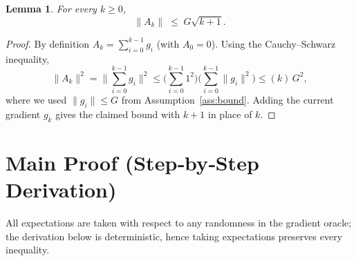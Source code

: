 \documentclass{article}
\newtheorem{lemma}{Lemma}
\begin{document}
\begin{lemma}\label{lem:cum}
For every $k\ge0$,
\[
\|A_k\|\;\le\; G\sqrt{k+1}.
\]
\end{lemma}
\begin{proof}
By definition $A_k=\sum_{i=0}^{k-1}g_i$ (with $A_0=0$). Using the Cauchy–Schwarz
inequality,
\[
\|A_k\|^2 = \Big\|\sum_{i=0}^{k-1}g_i\Big\|^2
          \le \Big(\sum_{i=0}^{k-1}1^2\Big)\Big(\sum_{i=0}^{k-1}\|g_i\|^2\Big)
          \le (k)\,G^{2},
\]
where we used $\|g_i\|\le G$ from Assumption~\ref{ass:bound}. Adding the
current gradient $g_k$ gives the claimed bound with $k+1$ in place of $k$.
\end{proof}

\section*{Main Proof (Step‑by‑Step Derivation)}
All expectations are taken with respect to any randomness in the gradient
oracle; the derivation below is deterministic, hence taking expectations
preserves every inequality.
\end{document}
